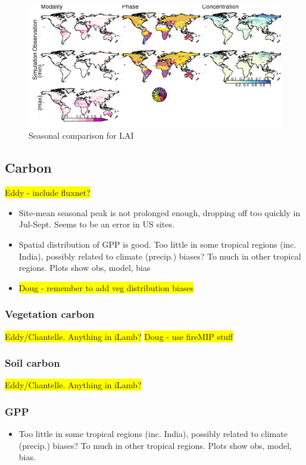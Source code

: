 \documentclass[bg, manuscript]{copernicus}
\newcommand{\hilight}[1]{\colorbox{yellow}{#1}}
\begin{document}
\begin{figure}[t]
    \includegraphics[width=12cm]{figs/LAI/fire_var_seasonality-maps-MPCcontrol-lai.png}
    \caption{Seasonal comparison for LAI \label{fig:LAIseasonalMap}}
\end{figure}


\subsection{Carbon}
\hilight{Eddy - include fluxnet?}

\begin{itemize}
    \item Site-mean seasonal peak is not prolonged enough, dropping off too quickly in Jul-Sept. Seems to be an error in US sites.
    \item Spatial distribution of GPP is good. Too little in some tropical regions (inc. India), possibly related to climate (precip.) biases? To much in other tropical regions. Plots show obs, model, bias
    \item \hilight{Doug - remember to add veg distribution biases}
\end{itemize}

\subsubsection{Vegetation carbon}
\hilight{Eddy/Chantelle. Anything in iLamb?}
\hilight{Doug - use fireMIP stuff}

\subsubsection{Soil carbon}
\hilight{Eddy/Chantelle. Anything in iLamb?}

\subsubsection{GPP}
\begin{itemize}
    \item Too little in some tropical regions (inc. India), possibly related to climate (precip.) biases? To much in other tropical regions. Plots show obs, model, bias.
\end{itemize}
\end{document}
